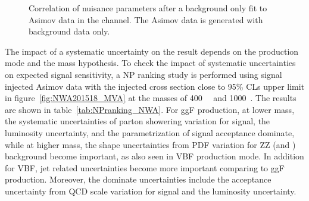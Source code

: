 \begin{figure}[!ht]
\begin{center}
\caption{Correlation of nuisance parameters after a background only fit to Asimov data in the \llll channel.
The Asimov data is generated with background data only.
}
\label{fig:NPcorr_cb_asimov}
\end{center}
\end{figure}

The impact of a systematic uncertainty on the result depends on the production mode and the mass hypothesis.
To check the impact of systematic uncertainties on expected signal sensitivity, a NP ranking study is performed using
signal injected Asimov data with the injected cross section close to 95\% CLs upper limit in figure~\ref{fig:NWA201518_MVA} at the masses of 400~\gev~ and 1000~\gev.
The results are shown in table~\ref{tab:NPranking_NWA}.
For ggF production, at lower mass, the systematic uncertainties of parton showering variation for signal, the luminosity uncertainty, 
and the parametrization of signal acceptance dominate,
while at higher mass, the shape uncertainties from PDF variation for ZZ (\qqZZ and \ggZZ) background become important, as also seen in VBF production mode.
In addition for VBF, jet related uncertainties become more important comparing to ggF production.
Moreover, the dominate uncertainties include the acceptance uncertainty from QCD scale variation for signal and the luminosity uncertainty.

